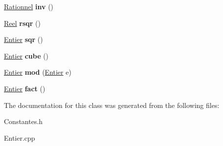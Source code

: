 \begin{DoxyCompactItemize}
\item 
\hypertarget{class_calcul_1_1_entier_ab3e28ed4b6259effa2998d179c59a023}{\hyperlink{class_calcul_1_1_rationnel}{Rationnel} {\bfseries inv} ()}\label{class_calcul_1_1_entier_ab3e28ed4b6259effa2998d179c59a023}

\item 
\hypertarget{class_calcul_1_1_entier_a05258eaa39ecc76509832fc84c4ada12}{\hyperlink{class_calcul_1_1_reel}{Reel} {\bfseries rsqr} ()}\label{class_calcul_1_1_entier_a05258eaa39ecc76509832fc84c4ada12}

\item 
\hypertarget{class_calcul_1_1_entier_accf5c68078b59f2ef3490195042d5b24}{\hyperlink{class_calcul_1_1_entier}{Entier} {\bfseries sqr} ()}\label{class_calcul_1_1_entier_accf5c68078b59f2ef3490195042d5b24}

\item 
\hypertarget{class_calcul_1_1_entier_a83c2833fe6841dcaa0c10beea1750a67}{\hyperlink{class_calcul_1_1_entier}{Entier} {\bfseries cube} ()}\label{class_calcul_1_1_entier_a83c2833fe6841dcaa0c10beea1750a67}

\item 
\hypertarget{class_calcul_1_1_entier_a16bb18c00fcb6a4c554c3eac3ff0939d}{\hyperlink{class_calcul_1_1_entier}{Entier} {\bfseries mod} (\hyperlink{class_calcul_1_1_entier}{Entier} e)}\label{class_calcul_1_1_entier_a16bb18c00fcb6a4c554c3eac3ff0939d}

\item 
\hypertarget{class_calcul_1_1_entier_a15488e68a0c47b0fa36baa2b3553bce9}{\hyperlink{class_calcul_1_1_entier}{Entier} {\bfseries fact} ()}\label{class_calcul_1_1_entier_a15488e68a0c47b0fa36baa2b3553bce9}

\end{DoxyCompactItemize}


The documentation for this class was generated from the following files\-:\begin{DoxyCompactItemize}
\item 
Constantes.\-h\item 
Entier.\-cpp\end{DoxyCompactItemize}
